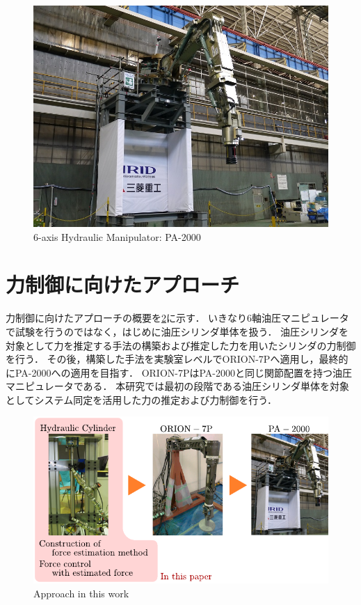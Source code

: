 \begin{figure}[t]
    \centering
        \includegraphics[keepaspectratio, width = .8\linewidth]{contents/緒言/figure/PA-2000.jpg}
        \caption{6-axis Hydraulic Manipulator: PA-2000}
        \label{fig:PA-2000}
\end{figure}

\section{力制御に向けたアプローチ}
力制御に向けたアプローチの概要を\figname\ref{fig:approach_thiswork}に示す．
いきなり6軸油圧マニピュレータで試験を行うのではなく，はじめに油圧シリンダ単体を扱う．
油圧シリンダを対象として力を推定する手法の構築および推定した力を用いたシリンダの力制御を行う．
その後，構築した手法を実験室レベルでORION-7Pへ適用し，最終的にPA-2000への適用を目指す．
ORION-7PはPA-2000と同じ関節配置を持つ油圧マニピュレータである．
本研究では最初の段階である油圧シリンダ単体を対象としてシステム同定を活用した力の推定および力制御を行う．

\begin{figure}[t]
    \centering
        \includegraphics[keepaspectratio, scale=1.0]{contents/緒言/figure/approach_thiswork.pdf}
        \caption{Approach in this work}
        \label{fig:approach_thiswork}
\end{figure}


